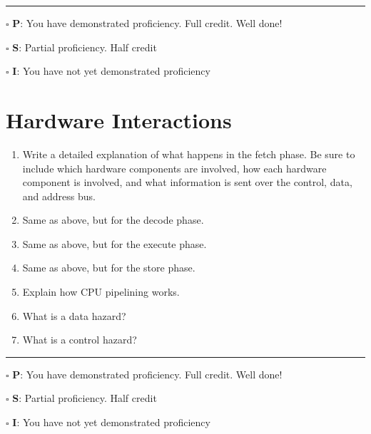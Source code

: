 \documentclass[12pt]{article}
\begin{document}
\vfill

\rule[1ex]{\textwidth}{.1pt}

$\square$ \textbf{P}: You have demonstrated proficiency. Full credit. Well done!

$\square$ \textbf{S}: Partial proficiency. Half credit

$\square$ \textbf{I}: You have not yet demonstrated proficiency

\newpage



\section*{Hardware Interactions}


\begin{enumerate}
\item Write a detailed explanation of what happens in the fetch phase. Be sure to include which hardware components are involved, how each hardware component is involved, and what information is sent over the control, data, and address bus.
\vfill

\item Same as above, but for the decode phase.
\vfill

\item Same as above, but for the execute phase.
\vfill

\item Same as above, but for the store phase.
\vfill

\item Explain how CPU pipelining works.
\vfill

\item What is a data hazard?
\vfill

\item What is a control hazard?
\end{enumerate}

\vfill

\rule[1ex]{\textwidth}{.1pt}

$\square$ \textbf{P}: You have demonstrated proficiency. Full credit. Well done!

$\square$ \textbf{S}: Partial proficiency. Half credit

$\square$ \textbf{I}: You have not yet demonstrated proficiency

\newpage


\end{document}
